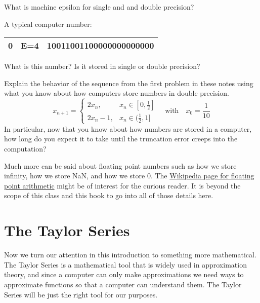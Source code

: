 \begin{problem}
    What is machine epsilon for single and and double precision?
\end{problem}



\begin{problem}
A typical computer number:
    \begin{center}
        \begin{tabular}{|c|c|c|}
            \hline
            0 & E=4 & 10011001100000000000000 \\ \hline
        \end{tabular}
    \end{center}
    What is this number?  Is it stored in single or double precision? 
\end{problem}


\begin{problem}
    Explain the behavior of the sequence from the first problem in these notes using what
    you know about how computers store numbers in double precision.
    \[ x_{n+1} = \left\{ \begin{array}{ll} 2x_n, & x_n \in [0,\frac{1}{2}] \\ 2x_n - 1, & x_n \in
        (\frac{1}{2},1] \end{array} \right. \quad \text{with} \quad x_0 = \frac{1}{10} \]
    In particular, now that you know about how numbers are stored in a computer, how long
    do you expect it to take until the truncation error creeps into the computation?
\end{problem}

Much more can be said about floating point numbers such as how we store infinity, how we store
NaN, and how we store 0.  The
\href{https://en.wikipedia.org/wiki/Floating-point_arithmetic}{Wikipedia page for floating
point arithmetic} might be of interest for the curious reader.  It is beyond the scope of
this class and this book to go into all of those details here.




\newpage\section{The Taylor Series}
Now we turn our attention in this introduction to something more mathematical.  The Taylor
Series is a mathematical tool that is widely used in approximation theory, and since a 
computer can only make approximations we need ways to approximate functions so that a
computer can understand them. The Taylor Series will be just the right tool for our
purposes.

